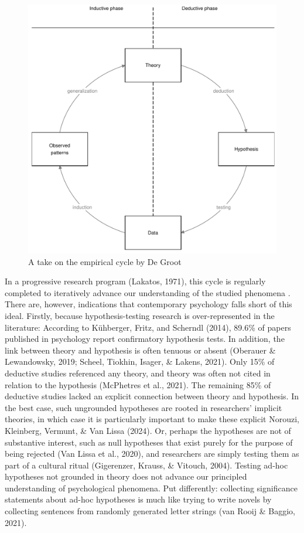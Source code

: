 \documentclass[
  man,floatsintext]{apa6}
\begin{document}
\begin{figure}
\centering
\includegraphics{empirical_cycle.pdf}
\caption{\label{fig:figec}A take on the empirical cycle by De Groot}
\end{figure}

In a progressive research program (Lakatos, 1971),
this cycle is regularly completed to iteratively advance our understanding of the studied phenomena
.
There are, however, indications that contemporary psychology falls short of this ideal.
Firstly, because hypothesis-testing research is over-represented in the literature:
According to Kühberger, Fritz, and Scherndl (2014), 89.6\% of papers published in psychology report confirmatory hypothesis tests.
In addition, the link between theory and hypothesis is often tenuous or absent (Oberauer \& Lewandowsky, 2019; Scheel, Tiokhin, Isager, \& Lakens, 2021).
Only 15\% of deductive studies referenced any theory, and theory was often not cited in relation to the hypothesis (McPhetres et al., 2021).
The remaining 85\% of deductive studies lacked an explicit connection between theory and hypothesis.
In the best case, such ungrounded hypotheses are rooted in researchers' implicit theories, in which case it is particularly important to make these explicit Norouzi, Kleinberg, Vermunt, \& Van Lissa (2024).
Or, perhaps the hypotheses are not of substantive interest, such as null hypotheses that exist purely for the purpose of being rejected (Van Lissa et al., 2020), and researchers are simply testing them as part of a cultural ritual (Gigerenzer, Krauss, \& Vitouch, 2004).
Testing ad-hoc hypotheses not grounded in theory does not advance our principled understanding of psychological phenomena.
Put differently: collecting significance statements about ad-hoc hypotheses is much like trying to write novels by collecting sentences from randomly generated letter strings (van Rooij \& Baggio, 2021).
\end{document}
